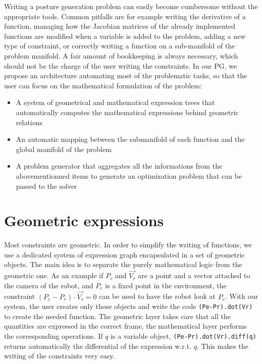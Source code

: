 Writing a posture generation problem can easily become cumbersome without the appropriate tools.
Common pitfalls are for example writing the derivative of a function, managing how the Jacobian matrices of the already implemented functions are modified when a variable is added to the problem, adding a new type of constraint, or correctly writing a function on a sub-manifold of the problem manifold.
A fair amount of bookkeeping is always necessary, which should not be the charge of the user writing the constraints.
In our PG, we propose an architecture automating most of the problematic tasks, so that the user can focus on the mathematical formulation of the problem:
\begin{itemize}
  \item A system of geometrical and mathematical expression trees that automatically computes the mathematical expressions behind geometric relations
  \item An automatic mapping between the submanifold of each function and the global manifold of the problem
  \item A problem generator that aggregates all the informations from the abovementionned items to generate an optimization problem that can be passed to the solver
\end{itemize}



\section{Geometric expressions}
\label{sec:geometric_expressions}

Most constraints are geometric.
In order to simplify the writing of functions, we use a dedicated system of expression graph encapsulated in a set of geometric objects.
The main idea is to separate the purely mathematical logic from the geometric one.
As an example if $P_r$ and $\overrightarrow{V_r}$ are a point and a vector attached to the camera of the robot, and $P_e$ is a fixed point in the environment, the constraint $(P_e - P_r)\cdot \overrightarrow{V_r} = 0$ can be used to have the robot look at $P_e$.
With our system, the user creates only those objects and write the code \texttt{(Pe-Pr).dot(Vr)} to create the needed function.
The geometric layer takes care that all the quantities are expressed in the correct frame, the mathematical layer performs the corresponding operations.
If $q$ is a variable object, \texttt{(Pe-Pr).dot(Vr).diff(q)} returns automatically the differential of the expression w.r.t. $q$. This makes the writing of the constraints very easy.

